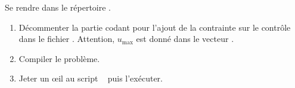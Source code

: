 \begin{myExercice} Se rendre dans le r\'epertoire .
    \begin{enumerate}
        \item D\'ecommenter la partie codant pour l'ajout de la contrainte sur le contr\^ole dans le fichier .
            Attention, $u_\mathrm{max}$ est donn\'e dans le vecteur .
        \item Compiler le probl\`eme.
        \item Jeter un \oe il au script \matlab\  puis l'ex\'ecuter.
    \end{enumerate}
\end{myExercice}


